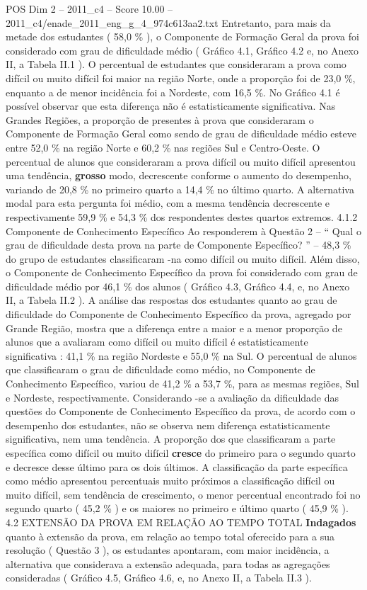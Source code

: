 \begin{textsample}{POS Dim 2 – 2011\_c4 – Score 10.00 – 2011\_c4/enade\_2011\_eng\_g\_4\_974c613aa2.txt}
Entretanto, para mais da metade dos estudantes ( 58,0 \% ), o Componente de Formação Geral da prova foi considerado com grau de dificuldade médio ( Gráfico 4.1, Gráfico 4.2 e, no Anexo II, a Tabela II.1 ).
O percentual de estudantes que consideraram a prova como difícil ou muito difícil foi maior na região Norte, onde a proporção foi de 23,0 \%, enquanto a de menor incidência foi a Nordeste, com 16,5 \%.
No Gráfico 4.1 é possível observar que esta diferença não é estatisticamente significativa.
Nas Grandes Regiões, a proporção de presentes à prova que consideraram o Componente de Formação Geral como sendo de grau de dificuldade médio esteve entre 52,0 \% na região Norte e 60,2 \% nas regiões Sul e Centro-Oeste.
O percentual de alunos que consideraram a prova difícil ou muito difícil apresentou uma tendência, \textbf{grosso} modo, decrescente conforme o aumento do desempenho, variando de 20,8 \% no primeiro quarto a 14,4 \% no último quarto.
A alternativa modal para esta pergunta foi médio, com a mesma tendência decrescente e respectivamente 59,9 \% e 54,3 \% dos respondentes destes quartos extremos. 4.1.2 Componente de Conhecimento Específico Ao responderem à Questão 2 – “ Qual o grau de dificuldade desta prova na parte de Componente Específico? ” – 48,3 \% do grupo de estudantes classificaram -na como difícil ou muito difícil.
Além disso, o Componente de Conhecimento Específico da prova foi considerado com grau de dificuldade médio por 46,1 \% dos alunos ( Gráfico 4.3, Gráfico 4.4, e, no Anexo II, a Tabela II.2 ).
A análise das respostas dos estudantes quanto ao grau de dificuldade do Componente de Conhecimento Específico da prova, agregado por Grande Região, mostra que a diferença entre a maior e a menor proporção de alunos que a avaliaram como difícil ou muito difícil é estatisticamente significativa : 41,1 \% na região Nordeste e 55,0 \% na Sul.
O percentual de alunos que classificaram o grau de dificuldade como médio, no Componente de Conhecimento Específico, variou de 41,2 \% a 53,7 \%, para as mesmas regiões, Sul e Nordeste, respectivamente.
Considerando -se a avaliação da dificuldade das questões do Componente de Conhecimento Específico da prova, de acordo com o desempenho dos estudantes, não se observa nem diferença estatisticamente significativa, nem uma tendência.
A proporção dos que classificaram a parte específica como difícil ou muito difícil \textbf{cresce} do primeiro para o segundo quarto e decresce desse último para os dois últimos.
A classificação da parte específica como médio apresentou percentuais muito próximos a classificação difícil ou muito difícil, sem tendência de crescimento, o menor percentual encontrado foi no segundo quarto ( 45,2 \% ) e os maiores no primeiro e último quarto ( 45,9 \% ). 4.2 EXTENSÃO DA PROVA EM RELAÇÃO AO TEMPO TOTAL \textbf{Indagados} quanto à extensão da prova, em relação ao tempo total oferecido para a sua resolução ( Questão 3 ), os estudantes apontaram, com maior incidência, a alternativa que considerava a extensão adequada, para todas as agregações consideradas ( Gráfico 4.5, Gráfico 4.6, e, no Anexo II, a Tabela II.3 ).

\end{textsample}
